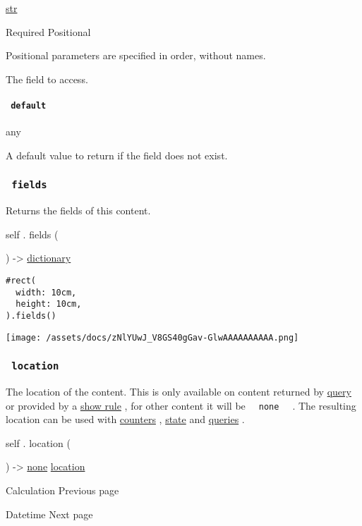 \href{/docs/reference/foundations/str/}{str}

{Required} {{ Positional }}

\label{definitions-at-field-positional-tooltip}
Positional parameters are specified in order, without names.

The field to access.

\paragraph{\texorpdfstring{\texttt{\ default\ }}{ default }}\label{definitions-at-default}

{ any }

A default value to return if the field does not exist.

\subsubsection{\texorpdfstring{\texttt{\ fields\ }}{ fields }}\label{definitions-fields}

Returns the fields of this content.

self { . } { fields } (

) -\textgreater{}
\href{/docs/reference/foundations/dictionary/}{dictionary}

\begin{verbatim}
#rect(
  width: 10cm,
  height: 10cm,
).fields()
\end{verbatim}

\texttt{[image: /assets/docs/zNlYUwJ\_V8GS40gGav-GlwAAAAAAAAAA.png]}

\subsubsection{\texorpdfstring{\texttt{\ location\ }}{ location }}\label{definitions-location}

The location of the content. This is only available on content returned
by \href{/docs/reference/introspection/query/}{query} or provided by a
\href{/docs/reference/styling/\#show-rules}{show rule} , for other
content it will be \texttt{\ }{\texttt{\ none\ }}\texttt{\ } . The
resulting location can be used with
\href{/docs/reference/introspection/counter/}{counters} ,
\href{/docs/reference/introspection/state/}{state} and
\href{/docs/reference/introspection/query/}{queries} .

self { . } { location } (

) -\textgreater{} \href{/docs/reference/foundations/none/}{none}
\href{/docs/reference/introspection/location/}{location}

\href{/docs/reference/foundations/calc/}{\pandocbounded{}}

{ Calculation } { Previous page }

\href{/docs/reference/foundations/datetime/}{\pandocbounded{}}

{ Datetime } { Next page }
